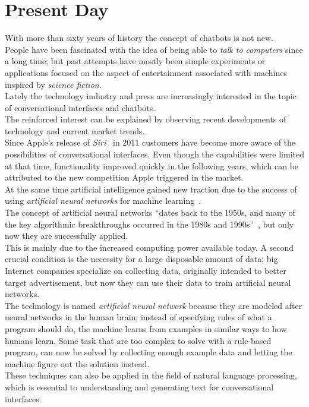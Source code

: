 \section{Present Day}
\label{presentday}


With more than sixty years of history the concept of chatbots is not new.
\\
People have been fascinated with the idea of being able to \emph{talk to computers} since a long time;
but past attempts have mostly been simple experiments or applications focused on the aspect of entertainment associated with machines inspired by \emph{science fiction}.
\\

Lately the technology industry and press are increasingly interested in the topic of conversational interfaces and chatbots.
\\
The reinforced interest can be explained by observing recent developments of technology and current market trends.
\\

Since Apple's release of \emph{Siri}~\cite{iphonelaunch} in 2011 customers have become more aware of the possibilities of conversational interfaces.
Even though the capabilities were limited at that time,
functionality improved quickly in the following years,
which can be attributed to the new competition Apple triggered in the market.
\\

At the same time artificial intelligence gained new traction due to the success of using \emph{artificial neural networks} for machine learning~\cite{mltrend}.
\\
The concept of artificial neural networks ``dates back to the 1950s, and many of the key algorithmic breakthroughs occurred in the 1980s and 1990s''~\cite{airevolution},
but only now they are successfully applied.
\\
This is mainly due to the increased computing power available today.
A second crucial condition is the necessity for a large disposable amount of data;
big Internet companies specialize on collecting data, originally intended to better target advertisement,
but now they can use their data to train artificial neural networks.
\\
The technology is named \emph{artificial neural network} because they are modeled after neural networks in the human brain;
instead of specifying rules of what a program should do, the machine learns from examples in similar ways to how humans learn.
Some task that are too complex to solve with a rule-based program, can now be solved by collecting enough example data
and letting the machine figure out the solution instead.
\\
These techniques can also be applied in the field of natural language processing,
which is essential to understanding and generating text for conversational interfaces.
\\

